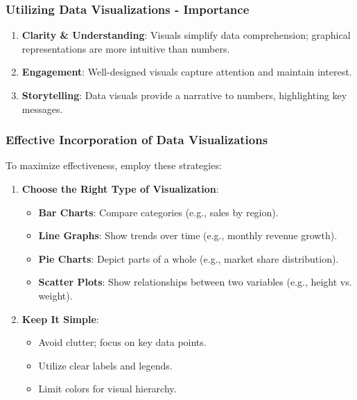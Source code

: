 \documentclass[aspectratio=169]{beamer}
\begin{document}
\begin{frame}[fragile]
    \frametitle{Utilizing Data Visualizations - Importance}
    \begin{enumerate}
        \item \textbf{Clarity \& Understanding}:
            Visuals simplify data comprehension; graphical representations are more intuitive than numbers.
            
        \item \textbf{Engagement}:
            Well-designed visuals capture attention and maintain interest.
            
        \item \textbf{Storytelling}:
            Data visuals provide a narrative to numbers, highlighting key messages.
    \end{enumerate}
\end{frame}

\begin{frame}[fragile]
    \frametitle{Effective Incorporation of Data Visualizations}
    To maximize effectiveness, employ these strategies:
    \begin{enumerate}
        \item \textbf{Choose the Right Type of Visualization}:
        \begin{itemize}
            \item \textbf{Bar Charts}: Compare categories (e.g., sales by region).
            \item \textbf{Line Graphs}: Show trends over time (e.g., monthly revenue growth).
            \item \textbf{Pie Charts}: Depict parts of a whole (e.g., market share distribution).
            \item \textbf{Scatter Plots}: Show relationships between two variables (e.g., height vs. weight).
        \end{itemize}
        
        \item \textbf{Keep It Simple}:
        \begin{itemize}
            \item Avoid clutter; focus on key data points.
            \item Utilize clear labels and legends.
            \item Limit colors for visual hierarchy.
        \end{itemize}
    \end{enumerate}
\end{frame}
\end{document}
